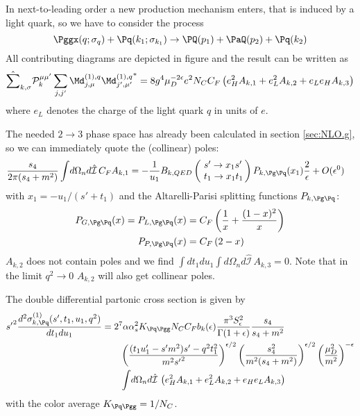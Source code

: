In next-to-leading order a new production mechanism enters, that is induced by a light quark, so we have to consider the process
\begin{equation}
\Pggx(q;\sigma_q) + \Pq(k_1;\sigma_{k_1}) \rightarrow \PQ(p_1)+\PaQ(p_2) + \Pq(k_2)
\end{equation}
All contributing diagrams are depicted in figure  and the result can be written as
\begin{equation}
\hat\sum_{k,\sigma}\mathcal P_{k}^{\mu\mu'}\sum_{j,j'}{\Md^{(1),q}_{j,\mu}\Md^{(1),q}_{j',\mu'}}^* = 8g^4\mu_D^{-2\epsilon}e^2 N_C C_F\left( e_H^2 A_{k,1} +  e_L^2 A_{k,2} +  e_L e_H A_{k,3} \right)
\end{equation}
where $e_L$ denotes the charge of the light quark $q$ in units of $e$.

The needed $2\rightarrow 3$ phase space has already been calculated in section \ref{sec:NLO.g}, so we can immediately quote the (collinear) poles:
\begin{align}
\frac{s_4}{2\pi(s_4+m^2)}\int\!d\Omega_n d\hat{\mathcal I}\,C_F A_{k,1} &=-\frac 1 {u_1}B_{k,QED}\left(\!\begin{array}{l}s'\rightarrow x_1s'\\t_1\rightarrow x_1 t_1\end{array}\!\!\right) P_{k,\Pg\Pq}(x_1)\frac 2 \epsilon + O(\epsilon^0)
\end{align}
with $x_1 = -u_1/(s'+t_1)$ and the Altarelli-Parisi splitting functions $P_{k,\Pg\Pq}$\cite{Altarelli:1977zs,Vogelsang:1995vh}:
\begin{align}
P_{G,\Pg\Pq}(x) = P_{L,\Pg\Pq}(x) &= C_F\left(\frac 1 x + \frac {(1-x)^2} x\right) \label{eq:PGLgq} \\
P_{P,\Pg\Pq}(x) &= C_F\left(2-x\right) \label{eq:PPgq}
\end{align}
$A_{k,2}$ does not contain poles and we find $\int\!dt_1du_1\int\!d\Omega_n d\hat{\mathcal I}\,A_{k,3}=0$. Note that in the limit $q^2\rightarrow 0$ $A_{k,2}$ will also get collinear poles.


The double differential partonic cross section is given by
\begin{align}
{s'}^2\frac{d^2\sigma_{k,\Pq}^{(1)}(s',t_1,u_1,q^2)}{dt_1du_1} &= 2^7\alpha\alpha_s^2 K_{\Pq\Pgg}N_CC_Fb_k(\epsilon)\frac{\pi^3 S_\epsilon^2}{\Gamma(1+\epsilon)} \frac{s_4}{s_4+m^2}  \nonumber\\
 &\hspace{20pt} \left(\frac{(t_1u_1'-s'm^2)s' - q^2t_1^2}{m^2{s'}^2}\right)^{\epsilon/2} \left(\frac{s_4^2}{m^2(s_4+m^2)}\right)^{\epsilon/2} \left(\frac{\mu_D^2}{m^2}\right)^{-\epsilon} \nonumber\\
 &\hspace{20pt} \int\!d\Omega_n d\hat{\mathcal I}\,\left(e_H^2 A_{k,1} + e_L^2 A_{k,2} + e_H e_L A_{k,3} \right)
\end{align}
with the color average $K_{\Pq\Pgg} = 1/N_C$.
